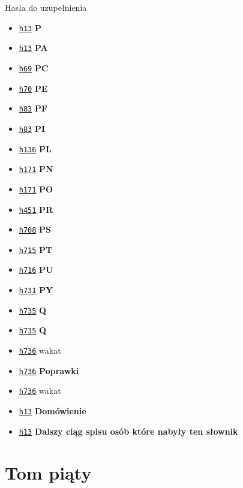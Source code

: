 \documentclass[12]{mwart}
\begin{document}
Hasła do uzupełnienia

\begin{itemize}
\item \href{\paiv{4}{15}}{\texttt{h13}} \textbf{P}
\item \href{\paiv{4}{15}}{\texttt{h13}} \textbf{PA}
\item \href{\paiv{4}{15}}{\texttt{h69}} \textbf{PC}
\item \href{\paiv{4}{15}}{\texttt{h70}} \textbf{PE}
\item \href{\paiv{4}{15}}{\texttt{h83}} \textbf{PF}
\item \href{\paiv{4}{15}}{\texttt{h83}} \textbf{PI}
\item \href{\paiv{4}{15}}{\texttt{h136}} \textbf{PL}
\item \href{\paiv{4}{15}}{\texttt{h171}} \textbf{PN}
\item \href{\paiv{4}{15}}{\texttt{h171}} \textbf{PO}
\item \href{\paiv{4}{15}}{\texttt{h451}} \textbf{PR}
\item \href{\paiv{4}{15}}{\texttt{h708}} \textbf{PS}
\item \href{\paiv{4}{15}}{\texttt{h715}} \textbf{PT}
\item \href{\paiv{4}{15}}{\texttt{h716}} \textbf{PU}
\item \href{\paiv{4}{15}}{\texttt{h731}} \textbf{PY}
\item \href{\paiv{4}{15}}{\texttt{h735}} \textbf{Q}
\item \href{\paiv{4}{15}}{\texttt{h735}} \textbf{Q}
\item \href{\paiv{4}{15}}{\texttt{h736}} wakat
\item \href{\paiv{4}{15}}{\texttt{h736}} \textbf{Poprawki}
\item \href{\paiv{4}{15}}{\texttt{h736}} wakat
\item \href{\paiv{4}{15}}{\texttt{h13}} \textbf{Domówienie}
\item \href{\paiv{4}{15}}{\texttt{h13}} \textbf{Dalszy ciąg spisu osób które nabyły ten słownik}
\end{itemize}


\section{Tom piąty}
\label{sec:tom-pity}

\newcommand{\pav}[2]{http://teksty.klf.uw.edu.pl/20/18/LindeIIGP#1ocri.djvu?djvuopts=\&page=#2\&zoom=page}
\end{document}
